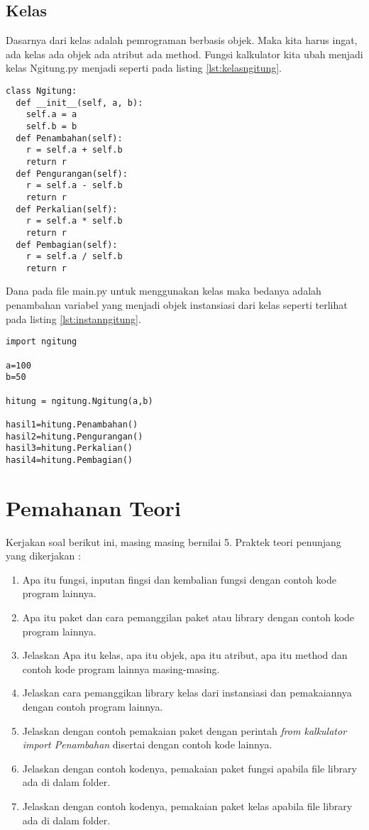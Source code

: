\subsection{Kelas}
Dasarnya dari kelas adalah pemrograman berbasis objek. Maka kita harus ingat, ada kelas ada objek ada atribut ada method. Fungsi kalkulator kita ubah menjadi kelas Ngitung.py menjadi seperti pada listing \ref{lst:kelasngitung}.
\begin{lstlisting}[caption=Kelas library kalkulator,label={lst:kelasngitung}]
class Ngitung:
  def __init__(self, a, b):
    self.a = a
    self.b = b
  def Penambahan(self):
    r = self.a + self.b
    return r
  def Pengurangan(self):
    r = self.a - self.b
    return r
  def Perkalian(self):
    r = self.a * self.b
    return r
  def Pembagian(self):
    r = self.a / self.b
    return r
\end{lstlisting}
Dana pada file main.py untuk menggunakan kelas maka bedanya adalah penambahan variabel yang menjadi objek instansiasi dari kelas seperti terlihat pada listing \ref{lst:instanngitung}.
\begin{lstlisting}[caption=Cara penggunaan kelas library kalkulator,label={lst:instanngitung}]
import ngitung

a=100
b=50

hitung = ngitung.Ngitung(a,b)

hasil1=hitung.Penambahan()
hasil2=hitung.Pengurangan()
hasil3=hitung.Perkalian()
hasil4=hitung.Pembagian()
\end{lstlisting}



\section{Pemahanan Teori}
Kerjakan soal berikut ini, masing masing bernilai 5. 
Praktek teori penunjang yang dikerjakan :
\begin{enumerate}
\item
Apa itu fungsi, inputan fingsi dan kembalian fungsi dengan contoh kode program lainnya.
\item
Apa itu paket dan cara pemanggilan paket atau library dengan contoh kode program lainnya.
\item
Jelaskan Apa itu kelas, apa itu objek, apa itu atribut, apa itu method dan contoh kode program lainnya masing-masing.
\item
Jelaskan cara pemanggikan library kelas dari instansiasi dan pemakaiannya dengan contoh program lainnya.
\item
Jelaskan dengan contoh pemakaian paket dengan perintah \textit{from kalkulator import Penambahan} disertai dengan contoh kode lainnya.
\item
Jelaskan dengan contoh kodenya, pemakaian paket fungsi apabila file library ada di dalam folder.
\item
Jelaskan dengan contoh kodenya, pemakaian paket kelas apabila file library ada di dalam folder.
\end{enumerate}

